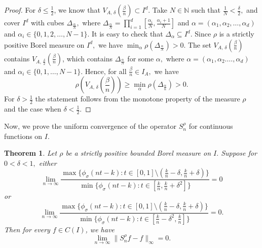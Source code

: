 \documentclass[12pt, reqno]{amsart}
\numberwithin{equation}{section}
\newtheorem{theorem}{Theorem}[section]
\theoremstyle{definition}
\theoremstyle{remark}
\numberwithin{equation}{section}
\newcommand{\N}{\mathbb{N}}
\begin{document}
  \begin{proof} For $\delta \leq\frac{1}{2}$, we know that $V_{A,\,\delta}\left(\frac{\beta}{n}\right)\subset I^d.$ Take $N\in\N$ such that $\frac{1}{N}<\frac{\delta}{2},$ and cover $I^d$ with cubes $\Delta_{\frac{\alpha}{N}},$ where $\Delta_{\frac{\alpha}{N}}=\prod_{i=1}^d[\frac{\alpha_i}{N}, \frac{\alpha_i+1}{N}]$ and $\alpha=(\alpha_1, \alpha_2,\ldots,\alpha_d)$ and $\alpha_i\in\{0, 1, 2,\ldots, N-1\}.$ It is easy to check that $\Delta_\alpha \subseteq I^d.$ Since $\rho$ is a strictly positive Borel measure on $I^d, $ we have $\min_{\alpha}\rho(\Delta_{\frac{\alpha}{N}})>0.$  
  The set $V_{A,\,\delta}\left(\frac{\beta}{n}\right)$ contains $V_{A,\,\frac{\delta}{2}}\left(\frac{\beta}{n}\right)$, which contains $\Delta_{\frac{\alpha}{N}}$ for some $\alpha,$ where $\alpha=(\alpha_1, \alpha_2.\ldots,\alpha_d)$ and $\alpha_i\in \{0,1,\ldots,N-1\}.$  Hence, for all $\frac{\beta}{n}\in I_A,$ we have
  $$\rho\left(V_{A,\,\delta}\left(\frac{\beta}{n}\right)\right)\geq\min_\alpha \rho(\Delta_{\frac{\alpha}{n}})>0.$$ 
  For $\delta>\frac{1}{2}$ the statement follows from the monotone property of the measure $\rho$
  and the case when $\delta<\frac{1}{2}.$
  
 
  
  
  
  \end{proof}


  Now, we prove the uniform convergence of the operator $S^{\rho}_{n}$ for continuous functions on $I.$

\begin{theorem} \label{uniapp}
Let $\rho$ be a strictly positive bounded Borel measure on $I.$  Suppose for $0<\delta<1,$ either
\begin{equation}
  \lim_{n\to\infty} \dfrac{\max\{\phi_\sigma(nt-k): t\in [0,1]\setminus (\frac{k}{n}-\delta, \frac{k}{n}+\delta) \}}{\min\{\phi_\sigma(nt-k): t\in[\frac{k}{n}, \frac{k}{n}+\delta^2]\}}= 0 %
\end{equation} or \begin{equation}
  \lim_{n\to\infty} \dfrac{\max\{\phi_\sigma(nt-k): t\in [0,1]\setminus (\frac{k}{n}-\delta, \frac{k}{n}+\delta) \}}{\min\{\phi_\sigma(nt-k): t\in[\frac{k}{n}-\delta^2, \frac{k}{n}]\}}= 0. %
\end{equation}
Then for every $f\in C(I)$, we have 
$$\lim_{n\to\infty}\|S^{\rho}_nf-f\|_{\infty}=0.$$
\end{theorem}
\end{document}
